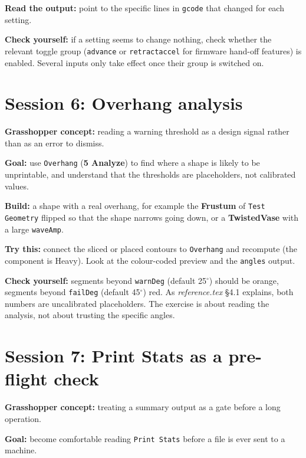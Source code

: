 \documentclass[11pt]{article}
\newcommand{\param}[1]{\texttt{#1}}
\newcommand{\iamdeg}{$^{\circ}$}
\newcommand{\exlabel}[1]{\par\vspace{0.3em}\noindent\textbf{#1:}\enspace}
\begin{document}
\exlabel{Read the output} point to the specific lines in \param{gcode}
that changed for each setting.

\exlabel{Check yourself} if a setting seems to change nothing, check
whether the relevant toggle group (\param{advance} or
\param{retractaccel} for firmware hand-off features) is enabled.
Several inputs only take effect once their group is switched on.

\section{Session 6: Overhang analysis}

\exlabel{Grasshopper concept} reading a warning threshold as a design
signal rather than as an error to dismiss.

\exlabel{Goal} use \param{Overhang} (\textbf{5 Analyze}) to find
where a shape is likely to be unprintable, and understand that the
thresholds are placeholders, not calibrated values.

\exlabel{Build} a shape with a real overhang, for example the
\textbf{Frustum} of \param{Test Geometry} flipped so that the
shape narrows going down, or a \textbf{TwistedVase} with a large
\param{waveAmp}.

\exlabel{Try this} connect the sliced or placed contours to
\param{Overhang} and recompute (the component is Heavy). Look at
the colour-coded preview and the \param{angles} output.

\exlabel{Check yourself} segments beyond \param{warnDeg} (default
25\iamdeg) should be orange, segments beyond \param{failDeg} (default
45\iamdeg) red. As \emph{reference.tex} \S 4.1 explains, both numbers
are uncalibrated placeholders. The exercise is about reading the
analysis, not about trusting the specific angles.

\section{Session 7: Print Stats as a pre-flight check}

\exlabel{Grasshopper concept} treating a summary output as a gate
before a long operation.

\exlabel{Goal} become comfortable reading \param{Print Stats}
before a file is ever sent to a machine.
\end{document}
